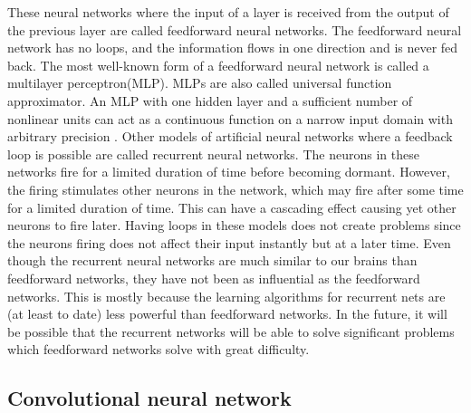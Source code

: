 These neural networks where the input of a layer is received from the output of the previous layer are called feedforward neural networks\cite{NN}\cite{hall199}. The feedforward neural network has no loops, and the information flows in one direction and is never fed back. The most well-known form of a feedforward neural network is called a multilayer perceptron(MLP). MLPs are also called universal function approximator. An MLP with one hidden layer and a sufficient number of nonlinear units can act as a continuous function on a narrow input domain with arbitrary precision \cite{Graves}.
Other models of artificial neural networks where a feedback loop is possible are called recurrent neural networks. The neurons in these networks fire for a limited duration of time before becoming dormant. However, the firing stimulates other neurons in the network, which may fire after some time for a limited duration of time. This can have a cascading effect causing yet other neurons to fire later. Having loops in these models does not create problems since the neurons firing does not affect their input instantly but at a later time. Even though the recurrent neural networks are much similar to our brains than feedforward networks, they have not been as influential as the feedforward networks. This is mostly because the learning algorithms for recurrent nets are (at least to date) less powerful than feedforward networks. In the future, it will be possible that the recurrent networks will be able to solve significant problems which feedforward networks solve with great difficulty.\cite{NN}



\subsection{Convolutional neural network}

